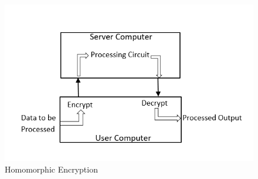 \begin{figure}[H]
\centering
\includegraphics[scale=0.7]{figures/Capture.PNG}
\caption{Homomorphic Encryption}
\label{fig:Homomorphic Encryption}
\end{figure}
